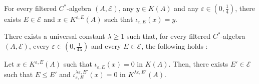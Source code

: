 \begin{rk}
For every filtered $C^*$-algebra $(A,\mathcal E)$, any $y\in K(A)$ and any $\varepsilon\in (0,\frac{1}{4})$, there exists $E\in\mathcal E$ and $x\in K^{\varepsilon,E}(A)$ such that $\iota_{\varepsilon,E}(x) = y$.
\end{rk}

\begin{rk}\label{approximation}
There exists a universal constant $\lambda \geq 1$ such that, for every filtered $C^*$-algebra $(A,\mathcal E)$, every $\varepsilon\in (0,\frac{1}{4\lambda})$ and every $E\in \mathcal E$, the following holds :

Let $x\in K^{\varepsilon,E}(A)$ such that $ \iota_{\varepsilon,E}(x) = 0 $ in $K(A)$. Then, there exists $E'\in\mathcal E$ such that $E\leq E'$ and $\iota_{\varepsilon,E}^{\lambda\varepsilon,E'}(x)=0$ in $K^{\lambda\varepsilon,E'}(A)$.
\end{rk}



